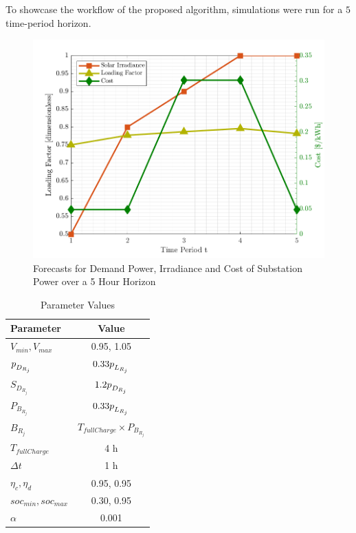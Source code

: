 \documentclass[../../outputs/main.tex]{subfiles}
\begin{document}
To showcase the workflow of the proposed algorithm, simulations were run for a $5$ time-period horizon. 

\begin{figure}[h!]
    \centering
    \includegraphics[height=0.25\textheight]{../figures/T5-inputCurves/InputCurves_Horizon_5.png}
    \caption{Forecasts for Demand Power, Irradiance and Cost of Substation Power over a 5 Hour Horizon}
    \label{fig:inputCurve-5}
\end{figure}

\def\ds{\rule{0pt}{1.5ex}} %

\begin{table}[h!]
    \centering
    \caption{Parameter Values}
    \begin{tabular}{|l|c|}
    \hline
    \textbf{Parameter} & \textbf{Value} \\ \hline
    $V_{min}, V_{max}$ & 0.95, 1.05 \\ \hline
    $p_{\ds D_{R_j}}$ & $0.33 p_{\ds L_{R_j}}$ \\ \hline
    $S_{D_{R_j}}$ & $1.2 p_{\ds D_{R_j}}$ \\ \hline
    $P_{B_{R_j}}$ & $0.33 p_{\ds L_{R_j}}$ \\ \hline
    $B_{R_j}$ & $T_{fullCharge} \times P_{B_{R_j}}$ \\ \hline
    $T_{fullCharge}$ & 4 h \\ \hline
    $\Delta t$ & 1 h \\ \hline
    $\eta_c, \eta_d$ & 0.95, 0.95 \\ \hline
    $soc_{min}, soc_{max}$ & 0.30, 0.95 \\ \hline
    $\alpha$ & 0.001 \\ \hline
    \end{tabular}
    \label{table:parameter-values}
\end{table}
\end{document}
